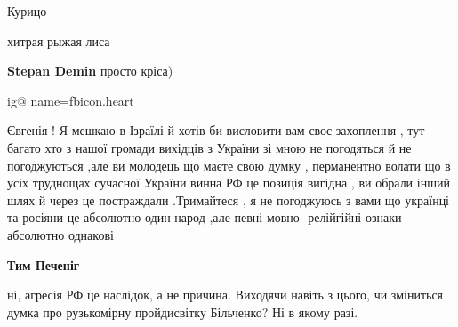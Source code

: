 \begin{itemize}
Курицо

 
хитрая рыжая лиса

\begin{itemize}
 
\textbf{Stepan Demin} просто кріса)
\end{itemize}


\ifcmt
  ig@ name=fbicon.heart
\fi

\par
 

Євгенія ! Я мешкаю в Ізраїлі й хотів би висловити вам своє захоплення , тут
багато хто з нашої громади вихідців з України зі мною не погодяться й не
погоджуються ,але ви молодець що маєте свою думку , перманентно волати що в
усіх труднощах сучасної України винна РФ це позиція вигідна , ви обрали інший
шлях й через це постраждали .Тримайтеся , я не погоджуюсь з вами що українці та
росіяни це абсолютно один народ ,але певні мовно -релійгійні ознаки абсолютно
однакові

\begin{itemize}
 
\textbf{Тим Печеніг} 

ні, агресія РФ це наслідок, а не причина. Виходячи навіть з цього, чи зміниться
думка про рузькомірну пройдисвітку Більченко? Ні в якому разі.



\end{itemize}
\end{itemize}

